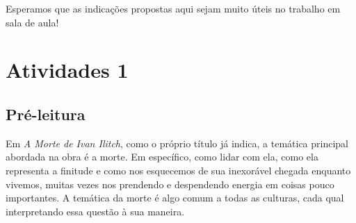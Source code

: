 \documentclass[12pt]{extarticle}
\begin{document}
Esperamos que as indicações propostas aqui sejam muito úteis no trabalho em
sala de aula! 






\tableofcontents




\section{Atividades 1}


\subsection{Pré-leitura}



Em \emph{A Morte de Ivan Ilitch}, como o próprio título já
indica, a temática principal abordada na obra é a morte. Em específico,
como lidar com ela, como ela representa a finitude e como nos esquecemos
de sua inexorável chegada enquanto vivemos, muitas vezes nos prendendo e
despendendo energia em coisas pouco importantes. A temática da morte é
algo comum a todas as culturas, cada qual interpretando essa questão à
sua maneira.
\end{document}
